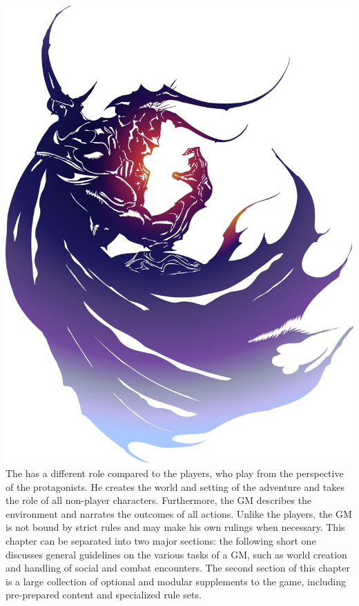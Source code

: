 %
\\\\
%
\includegraphics[width=\columnwidth]{./art/images/ff4.jpg} \\
%
\vfill
%
The  has a different role compared to the players, who play from the perspective of the protagonists.
He creates the world and setting of the adventure and takes the role of all non-player characters.
Furthermore, the GM describes the environment and narrates the outcomes of all actions. 
Unlike the players, the GM is not bound by strict rules and may make his own rulings when necessary.
This chapter can be separated into two major sections: the following short one discusses general guidelines on the various tasks of a GM, such as world creation and handling of social and combat encounters.
The second section of this chapter is a large collection of optional and modular supplements to the game, including pre-prepared content and specialized rule sets.

